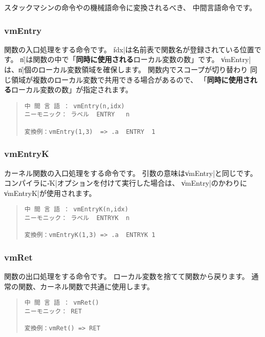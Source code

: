 スタックマシンの命令や\tac の機械語命令に変換されるべき、
中間言語命令です。

\subsubsection{vmEntry}

関数の入口処理をする命令です。
\|idx|は名前表で関数名が登録されている位置です。
\|n|は関数の中で「{\bf 同時に使用される}ローカル変数の数」です。
\|vmEntry|は、\|n|個のローカル変数領域を確保します。
関数内でスコープが切り替わり
同じ領域が複数のローカル変数で共用できる場合があるので、
「{\bf 同時に使用される}ローカル変数の数」が指定されます。

\begin{quote}
\begin{verbatim}
中 間 言 語 ： vmEntry(n,idx)
ニーモニック： ラベル  ENTRY   n

変換例：vmEntry(1,3)  => .a  ENTRY  1
\end{verbatim}
\end{quote}

\subsubsection{vmEntryK}

カーネル関数の入口処理をする命令です。
引数の意味は\|vmEntry|と同じです。
\cmm コンパイラに\|-K|オプションを付けて実行した場合は、
\|vmEntry|のかわりに\|vmEntryK|が使用されます。

\begin{quote}
\begin{verbatim}
中 間 言 語 ： vmEntryK(n,idx)
ニーモニック： ラベル  ENTRYK  n

変換例：vmEntryK(1,3) => .a  ENTRYK 1
\end{verbatim}
\end{quote}

\subsubsection{vmRet}

関数の出口処理をする命令です。
ローカル変数を捨てて関数から戻ります。
通常の関数、カーネル関数で共通に使用します。

\begin{quote}
\begin{verbatim}
中 間 言 語 ： vmRet()
ニーモニック： RET

変換例：vmRet() => RET
\end{verbatim}
\end{quote}


